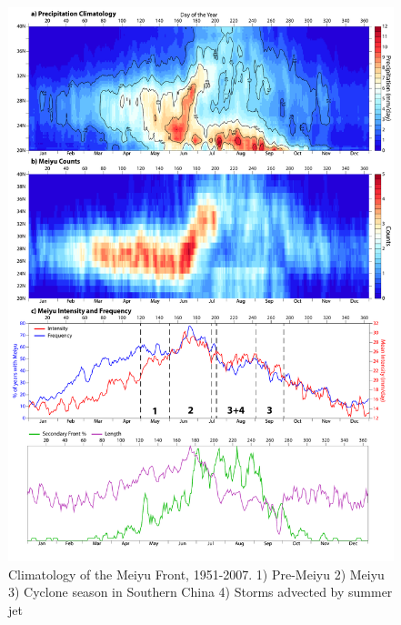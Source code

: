 \documentclass[draft,grl]{AGUTeX}
\begin{document}
\begin{figure}
\noindent\includegraphics[width=36pc]{Figures/fig1_dingchan.pdf}
\caption{Climatology of the Meiyu Front, 1951-2007. 1) Pre-Meiyu 2) Meiyu 3) Cyclone season in Southern China 4) Storms advected by summer jet}
\label{dingchan}
\end{figure}
\end{document}
